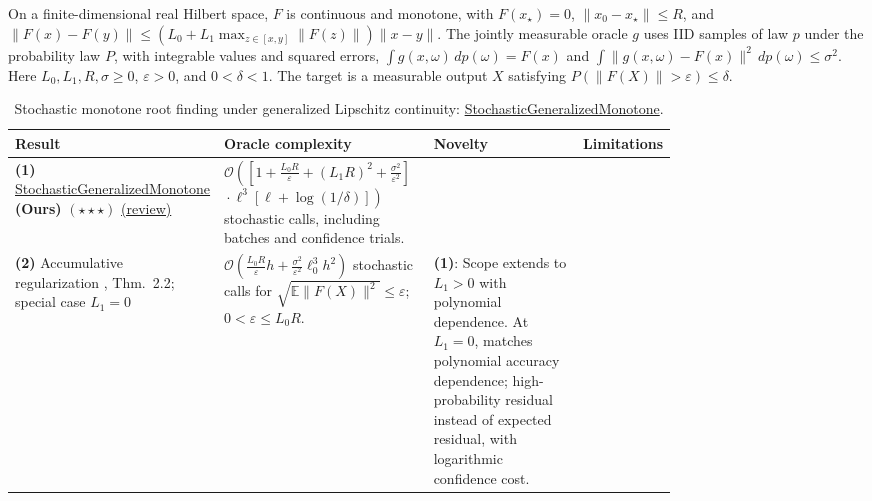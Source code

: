 \begin{table}[tp]
\centering
\caption{Stochastic monotone root finding under generalized Lipschitz continuity: \href{https://github.com/k3nfalt/longtails/blob/main/LongTails/Setups/StochasticGeneralizedMonotone.lean}{StochasticGeneralizedMonotone}.}\label{tab:StochasticGeneralizedMonotone}
\parbox{\linewidth}{\footnotesize
On a finite-dimensional real Hilbert space, $F$ is continuous and monotone, with $F(x_\star)=0$, $\|x_0-x_\star\|\le R$, and
$\|F(x)-F(y)\|\le (L_0+L_1\max_{z\in[x,y]}\|F(z)\|)\|x-y\|$.
The jointly measurable oracle $g$ uses IID samples of law $p$ under the probability law $P$, with integrable values and squared errors,
$\int g(x,\omega)\,dp(\omega)=F(x)$ and $\int\|g(x,\omega)-F(x)\|^2\,dp(\omega)\le\sigma^2$.
Here $L_0,L_1,R,\sigma\ge0$, $\varepsilon>0$, and $0<\delta<1$.
The target is a measurable output $X$ satisfying $P(\|F(X)\|>\varepsilon)\le\delta$.}\par\smallskip
\begin{threeparttable}
\footnotesize
\setlength{\tabcolsep}{4pt}\renewcommand{\arraystretch}{1.25}
\begin{tabularx}{\linewidth}{@{}>{\raggedright\arraybackslash}p{0.20\linewidth}>{\raggedright\arraybackslash}p{0.32\linewidth}>{\raggedright\arraybackslash}p{0.25\linewidth}>{\raggedright\arraybackslash}X@{}}
\toprule
\textbf{Result} & \textbf{Oracle complexity} & \textbf{Novelty} & \textbf{Limitations} \\
\midrule
\textbf{(1)} \href{https://github.com/k3nfalt/longtails/blob/main/LongTails/Theorems/StochasticGeneralizedMonotone.lean}{Stochastic\allowbreak Generalized\allowbreak Monotone} \textbf{(Ours)} $(\star\star\star)$ \href{https://github.com/k3nfalt/longtails/blob/main/scripts/reviews/StochasticGeneralizedMonotone.md}{(review)}
& $\mathcal{O}\!\left(\left[1+\frac{L_0R}{\varepsilon}+(L_1R)^2+\frac{\sigma^2}{\varepsilon^2}\right]\right.$\newline
$\left.{}\cdot\ell^3[\ell+\log(1/\delta)]\right)$ stochastic calls, including batches and confidence trials.
& & \\
\midrule[1.2pt]
\textbf{(2)} Accumulative regularization \citep{sgmJiLanZhu2026v1}, Thm.~2.2; special case $L_1=0$
& $\mathcal{O}\!\left(\frac{L_0R}{\varepsilon}h+\frac{\sigma^2}{\varepsilon^2}\ell_0^3h^2\right)$ stochastic calls for $\sqrt{\mathbb{E}\|F(X)\|^2}\le\varepsilon$; $0<\varepsilon\le L_0R$.
& \textbf{(1)}: Scope extends to $L_1>0$ with polynomial dependence. At $L_1=0$, matches polynomial accuracy dependence; high-probability residual instead of expected residual, with logarithmic confidence cost.

\end{tabularx}
\end{threeparttable}
\end{table}
